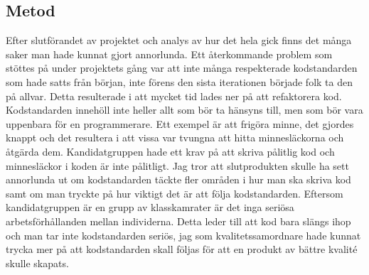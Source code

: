 \subsection{Metod}
Efter slutförandet av projektet och analys av hur det hela gick finns det många saker man hade kunnat gjort annorlunda. Ett återkommande problem som stöttes på under projektets gång var att inte många respekterade kodstandarden som hade satts från början, inte förens den sista iterationen började folk ta den på allvar. Detta resulterade i att mycket tid lades ner på att refaktorera kod. Kodstandarden innehöll inte heller allt som bör ta hänsyns till, men som bör vara uppenbara för en programmerare. Ett exempel är att frigöra minne, det gjordes knappt och det resultera i att vissa var tvungna att hitta minnesläckorna och åtgärda dem. Kandidatgruppen hade ett krav på att skriva pålitlig kod och minnesläckor i koden är inte pålitligt.
\newline
\newline
Jag tror att slutprodukten skulle ha sett annorlunda ut om kodstandarden täckte fler områden i hur man ska skriva kod samt om man tryckte på hur viktigt det är att följa kodstandarden. Eftersom kandidatgruppen är en grupp av klasskamrater är det inga seriösa arbetsförhållanden mellan individerna. Detta leder till att kod bara slängs ihop och man tar inte kodstandarden seriös, jag som kvalitetssamordnare hade kunnat trycka mer på att kodstandarden skall följas för att en produkt av bättre kvalité skulle skapats.